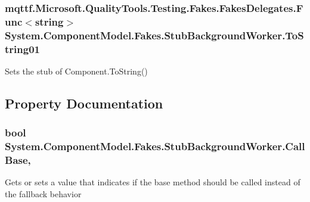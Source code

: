 \hypertarget{class_system_1_1_component_model_1_1_fakes_1_1_stub_background_worker_aad05ec233b50ccf0b524b682419ef697}{
\subsubsection[{To\-String01}]{\setlength{\rightskip}{0pt plus 5cm}mqttf.\-Microsoft.\-Quality\-Tools.\-Testing.\-Fakes.\-Fakes\-Delegates.\-Func$<$string$>$ System.\-Component\-Model.\-Fakes.\-Stub\-Background\-Worker.\-To\-String01}}\label{class_system_1_1_component_model_1_1_fakes_1_1_stub_background_worker_aad05ec233b50ccf0b524b682419ef697}


Sets the stub of Component.\-To\-String()



\subsection{Property Documentation}
\hypertarget{class_system_1_1_component_model_1_1_fakes_1_1_stub_background_worker_aa2552ba40b7d1e3b941290bf26646206}{
\subsubsection[{Call\-Base}]{\setlength{\rightskip}{0pt plus 5cm}bool System.\-Component\-Model.\-Fakes.\-Stub\-Background\-Worker.\-Call\-Base\hspace{0.3cm}{\ttfamily [get]}, {\ttfamily [set]}}}\label{class_system_1_1_component_model_1_1_fakes_1_1_stub_background_worker_aa2552ba40b7d1e3b941290bf26646206}


Gets or sets a value that indicates if the base method should be called instead of the fallback behavior

